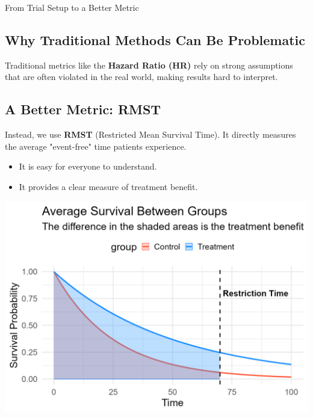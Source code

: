 \documentclass[a0,landscape]{a0poster}
\begin{document}
\begin{minipage}[t][\dimexpr\textheight-1cm\relax][t]{0.32\linewidth}
\begin{posterbox}{From Trial Setup to a Better Metric}
    \subsection*{\Large Why Traditional Methods Can Be Problematic}
    \Large
    Traditional metrics like the \textbf{Hazard Ratio (HR)} rely on strong assumptions that are often violated in the real world, making results hard to interpret.
    
    \subsection*{\Large A Better Metric: RMST}
    \Large
    Instead, we use \textbf{RMST} (Restricted Mean Survival Time). It directly measures the average "event-free" time patients experience.
    \begin{itemize} \itemsep=0.5em
        \item[\Large\checkmark]  It is easy for everyone to understand.
        \item[\Large\checkmark]  It provides a clear measure of treatment benefit.
    \end{itemize}
    
    \begin{center}
        \includegraphics[width=0.9\linewidth]{rmst_causal_plot.png}
    \end{center}
\end{posterbox}

\end{minipage}
\hfill
\end{document}
